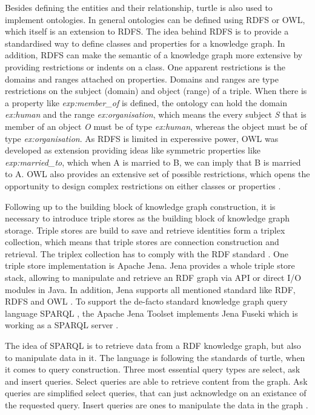 \documentclass[a4paper,oneside,bibliography=totoc]{scrbook}
\begin{document}
Besides defining the entities and their relationship, turtle is also used to implement ontologies. In general ontologies can be defined using \ac{RDFS} or \ac{OWL}, which itself is an extension to \ac{RDFS}. The idea behind \ac{RDFS} is to provide a standardised way to define classes and properties for a knowledge graph. In addition, \ac{RDFS} can make the semantic of a knowledge graph more extensive by providing restrictions or indents on a class. One apparent restrictions is the domains and ranges attached on properties. Domains and ranges are type restrictions on the subject (domain) and object (range) of a triple. When there is a property like \textit{exp:member\_of} is defined, the ontology can hold the domain \textit{ex:human} and the range \textit{ex:organisation}, which means the every subject \textit{S} that is member of an object \textit{O} must be of type \textit{ex:human}, whereas the object must be of type \textit{ex:organisation}. As \ac{RDFS} is limited in experessive power, \ac{OWL} was developed as extension providing ideas like symmetric properties like \textit{exp:married\_to}, which when A is married to B, we can imply that B is married to A. \ac{OWL} also provides an extensive set of possible restrictions, which opens the opportunity to design complex restrictions on either classes or properties \cite{VillazonTerrazas2017}.

Following up to the building block of knowledge graph construction, it is necessary to introduce triple stores as the building block of knowledge graph storage. Triple stores are build to save and retrieve identities form a triplex collection, which means that triple stores are connection construction and retrieval. The triplex collection has to comply with the \ac{RDF} standard \cite{Rusher2003}. One triple store implementation is Apache Jena. Jena provides a whole triple store stack, allowing to manipulate and retrieve an \ac{RDF} graph via API or direct I/O modules in Java. In addition, Jena supports all mentioned standard like \ac{RDF}, \ac{RDFS} and \ac{OWL} \cite{Carroll2004}. To support the de-facto standard knowledge graph query language \ac{SPARQL} \cite{VillazonTerrazas2017}, the Apache Jena Toolset implements Jena Fuseki which is working as a \ac{SPARQL} server \cite{Chokshi2022}.

The idea of \ac{SPARQL} is to retrieve data from a \ac{RDF} knowledge graph, but also to manipulate data in it. The language is following the standards of turtle, when it comes to query construction. Three most essential query types are select, ask and insert queries. Select queries are able to retrieve content from the graph. Ask queries are simplified select queries, that can just acknowledge on an existance of the requested query. Insert queries are ones to manipulate the data in the graph \cite{VillazonTerrazas2017}.
\end{document}
